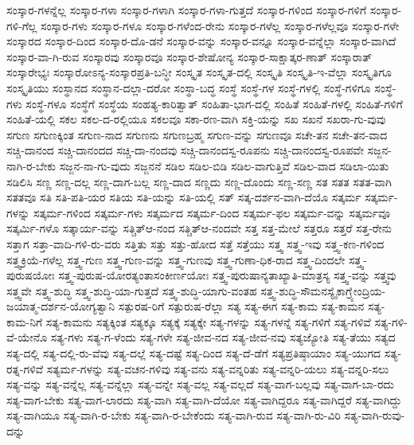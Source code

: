 {ಸಂಸ್ಕಾರ-ಗಳನ್ನೆಲ್ಲ
ಸಂಸ್ಕಾರ-ಗಳಾ
ಸಂಸ್ಕಾರ-ಗಳಾಗಿ
ಸಂಸ್ಕಾರ-ಗಳಾ-ಗುತ್ತದೆ
ಸಂಸ್ಕಾರ-ಗಳಿಂದ
ಸಂಸ್ಕಾರ-ಗಳಿಗೆ
ಸಂಸ್ಕಾರ-ಗಳಿ-ಗೆಲ್ಲ
ಸಂಸ್ಕಾರ-ಗಳು
ಸಂಸ್ಕಾರ-ಗಳೂ
ಸಂಸ್ಕಾರ-ಗಳೆಂದ-ರೇನು
ಸಂಸ್ಕಾರ-ಗಳೆಲ್ಲ
ಸಂಸ್ಕಾರ-ಗಳೆಲ್ಲವೂ
ಸಂಸ್ಕಾರ-ಗಳೇ
ಸಂಸ್ಕಾರದ
ಸಂಸ್ಕಾರ-ದಿಂದ
ಸಂಸ್ಕಾರ-ದೊ-ಡನೆ
ಸಂಸ್ಕಾರ-ವನ್ನು
ಸಂಸ್ಕಾರ-ವನ್ನೂ
ಸಂಸ್ಕಾರ-ವನ್ನೆಲ್ಲಾ
ಸಂಸ್ಕಾರ-ವಾಗಿದೆ
ಸಂಸ್ಕಾರ-ವಾ-ಗಿ-ರುವ
ಸಂಸ್ಕಾರವು
ಸಂಸ್ಕಾರವೂ
ಸಂಸ್ಕಾರ-ಶೇಷೋನ್ಯ
ಸಂಸ್ಕಾರ-ಸಾಕ್ಷಾತ್ಕರ-ಣಾತ್
ಸಂಸ್ಕಾರಾತ್
ಸಂಸ್ಕಾರೇಭ್ಯಃ
ಸಂಸ್ಕಾರೋಽನ್ಯ-ಸಂಸ್ಕಾರಪ್ರತಿ-ಬನ್ಧೀ
ಸಂಸ್ಕೃತ
ಸಂಸ್ಕೃತ-ದಲ್ಲಿ
ಸಂಸ್ಕೃತಿ
ಸಂಸ್ಕೃತಿ-ಇ-ವೆಲ್ಲಾ
ಸಂಸ್ಕೃತಿಗೂ
ಸಂಸ್ಕೃತಿಯು
ಸಂಸ್ಥಾನದ
ಸಂಸ್ಥಾನ-ದಲ್ಲಾ-ದರೋ
ಸಂಸ್ಥಾ-ಬದ್ಧ
ಸಂಸ್ಥೆ
ಸಂಸ್ಥೆ-ಗಳ
ಸಂಸ್ಥೆ-ಗಳಲ್ಲಿ
ಸಂಸ್ಥೆ-ಗಳಿಗೂ
ಸಂಸ್ಥೆ-ಗಳು
ಸಂಸ್ಥೆ-ಗಳೂ
ಸಂಸ್ಥೆಗೆ
ಸಂಸ್ಥೆಯ
ಸಂಹತ್ಯ-ಕಾರಿತ್ವಾತ್
ಸಂಹಿತಾ-ಭಾಗ-ದಲ್ಲಿ
ಸಂಹಿತೆ
ಸಂಹಿತೆ-ಗಳಲ್ಲಿ
ಸಂಹಿತೆ-ಗಳಿಗೆ
ಸಂಹಿತೆ-ಯಲ್ಲಿ
ಸಕಲ
ಸಕಲ-ದ-ರಲ್ಲಿಯೂ
ಸಕಲವೂ
ಸಕಾ-ರಣ-ವಾಗಿ
ಸಕ್ತಿ-ಯನ್ನು
ಸಖ
ಸಖನೆ
ಸಖರಾ-ಗು-ವುವು
ಸಗುಣ
ಸಗುಣಕ್ಕಿಂತ
ಸಗುಣ-ನಾದ
ಸಗುಣನು
ಸಗುಣಬ್ರಹ್ಮ
ಸಗುಣ-ವನ್ನು
ಸಗುಣವೂ
ಸಚೇ-ತನ
ಸಚೇ-ತನ-ವಾದ
ಸಚ್ಚಿ-ದಾನಂದ
ಸಚ್ಚಿ-ದಾನಂದದ
ಸಚ್ಚಿ-ದಾ-ನಂದವು
ಸಚ್ಚಿ-ದಾನಂದಸ್ವ-ರೂಪನು
ಸಚ್ಚಿ-ದಾನಂದಸ್ವ-ರೂಪವೇ
ಸಜ್ಜನ-ನಾಗಿ-ರ-ಬೇಕು
ಸಜ್ಜನ-ನಾ-ಗು-ವುದು
ಸಜ್ಜನನೆ
ಸಡಿಲ
ಸಡಿಲ-ಬಿಡಿ
ಸಡಿಲ-ವಾಗುತ್ತಿವೆ
ಸಡಿಲ-ವಾದ
ಸಡಿಲಾ-ಯಿತು
ಸಡಿಲಿಸಿ
ಸಣ್ಣ
ಸಣ್ಣ-ದಲ್ಲ
ಸಣ್ಣ-ದಾಗ-ಬಲ್ಲ
ಸಣ್ಣ-ದಾದ
ಸಣ್ಣದು
ಸಣ್ಣ-ದೊಂದು
ಸಣ್ಣ-ಸಣ್ಣ
ಸತ
ಸತತ
ಸತತ-ವಾಗಿ
ಸತತವೂ
ಸತಿ
ಸತಿ-ಪತಿ-ಯರ
ಸತಿಯ
ಸತಿ-ಯನ್ನು
ಸತಿ-ಯಲ್ಲಿ
ಸತ್
ಸತ್ಕ-ದರ್ಶನ-ವಾಗಿ-ದೆಯೊ
ಸತ್ಕರ್ಮ
ಸತ್ಕರ್ಮ-ಗಳನ್ನು
ಸತ್ಕರ್ಮ-ಗಳಿಂದ
ಸತ್ಕರ್ಮ-ಗಳು
ಸತ್ಕರ್ಮದ
ಸತ್ಕರ್ಮ-ದಿಂದ
ಸತ್ಕರ್ಮ-ಫಲ
ಸತ್ಕರ್ಮ-ವನ್ನು
ಸತ್ಕರ್ಮವೂ
ಸತ್ಕರ್ಮಿ-ಗಳೊ
ಸತ್ಕಾರ್ಯ-ವನ್ನು
ಸತ್ಚಿತ್ಆ-ನಂದ
ಸತ್ಚಿತ್ಆ-ನಂದವೇ
ಸತ್ತ
ಸತ್ತ-ಮೇಲೆ
ಸತ್ತರೂ
ಸತ್ತರೆ
ಸತ್ತ-ರೇನು
ಸತ್ತಾಗ
ಸತ್ತಾ-ವಾದಿ-ಗಳಿ-ರು-ವರು
ಸತ್ತಿತು
ಸತ್ತು
ಸತ್ತು-ಹೋದ
ಸತ್ತೆ
ಸತ್ತೆಯು
ಸತ್ತ್ವ
ಸತ್ತ್ವ-ಇವು
ಸತ್ತ್ವ-ಕಣ-ಗಳಿಂದ
ಸತ್ತ್ವಕ್ರಿಯೆ-ಗಳೆಲ್ಲ
ಸತ್ತ್ವ-ಗುಣ
ಸತ್ತ್ವ-ಗುಣ-ವನ್ನು
ಸತ್ತ್ವ-ಗುಣವು
ಸತ್ತ್ವ-ಗುಣಾ-ಧಿಕ-ರಾದ
ಸತ್ತ್ವ-ದಿಂದಲೇ
ಸತ್ತ್ವ-ಪುರುಷಯೋಃ
ಸತ್ತ್ವ-ಪುರುಷ-ಯೋರತ್ಯಂತಾಸಂಕೀರ್ಣಯೋಃ
ಸತ್ತ್ವ-ಪುರುಷಾನ್ಯತಾಖ್ಯಾತಿ-ಮಾತ್ರಸ್ಯ
ಸತ್ತ್ವ-ವನ್ನು
ಸತ್ತ್ವವು
ಸತ್ತ್ವವೇ
ಸತ್ತ್ವ-ಶುದ್ಧಿ
ಸತ್ತ್ವ-ಶುದ್ಧಿ-ಯಾ-ಗುತ್ತದೆ
ಸತ್ತ್ವ-ಶುದ್ಧಿ-ಯಾಗು-ವಂತಹ
ಸತ್ತ್ವ-ಶುದ್ಧಿ-ಸೌಮನಸ್ಯೈಕಾಗ್ರ್ಯೇಂದ್ರಿಯ-ಜಯಾತ್ಮ-ದರ್ಶನ-ಯೋಗ್ಯತ್ವಾನಿ
ಸತ್ಪುರಷ-ರಿಗೆ
ಸತ್ಪುರುಷ-ರೆಲ್ಲಾ
ಸತ್ಯ
ಸತ್ಯ-ಈಗ
ಸತ್ಯ-ಕಾಮ
ಸತ್ಯ-ಕಾಮನ
ಸತ್ಯ-ಕಾಮ-ನಿಗೆ
ಸತ್ಯ-ಕಾಮನು
ಸತ್ಯಕ್ಕಿಂತ
ಸತ್ಯಕ್ಕೂ
ಸತ್ಯಕ್ಕೆ
ಸತ್ಯಕ್ಕೇ
ಸತ್ಯ-ಗಳನ್ನು
ಸತ್ಯ-ಗಳನ್ನೆ
ಸತ್ಯ-ಗಳಿಗೆ
ಸತ್ಯ-ಗಳಿವೆ
ಸತ್ಯ-ಗಳಿ-ವೆ-ಯೇನೊ
ಸತ್ಯ-ಗಳು
ಸತ್ಯ-ಗ-ಳೆಂದು
ಸತ್ಯ-ಗಳೇ
ಸತ್ಯ-ಜೀವ-ನದ
ಸತ್ಯ-ಜೀವ-ನವು
ಸತ್ಯಜ್ಯೋತಿ
ಸತ್ಯ-ತೆಯು
ಸತ್ಯದ
ಸತ್ಯ-ದಲ್ಲಿ
ಸತ್ಯ-ದಲ್ಲಿ-ರು-ವೆವು
ಸತ್ಯ-ದಲ್ಲೆ
ಸತ್ಯ-ದಷ್ಟೆ
ಸತ್ಯ-ದಿಂದ
ಸತ್ಯ-ದೆ-ಡೆಗೆ
ಸತ್ಯಪ್ರತಿಷ್ಠಾಯಾಂ
ಸತ್ಯ-ಯುಗದ
ಸತ್ಯ-ರತ್ನ-ಗಳಿವೆ
ಸತ್ಯರ್ಮ-ಗಳನ್ನು
ಸತ್ಯ-ವಚನ-ಗಳಿವು
ಸತ್ಯ-ವನು
ಸತ್ಯ-ವನ್ನರಿತು
ಸತ್ಯ-ವನ್ನರಿ-ಯಲು
ಸತ್ಯ-ವನ್ನರಿ-ಸಲು
ಸತ್ಯ-ವನ್ನು
ಸತ್ಯ-ವನ್ನೆಲ್ಲ
ಸತ್ಯ-ವನ್ನೆಲ್ಲಾ
ಸತ್ಯ-ವನ್ನೇ
ಸತ್ಯ-ವಲ್ಲ
ಸತ್ಯ-ವಲ್ಲದೆ
ಸತ್ಯ-ವಾಗ-ಬಲ್ಲವು
ಸತ್ಯ-ವಾಗ-ಬಾ-ರದು
ಸತ್ಯ-ವಾಗ-ಬೇಕು
ಸತ್ಯ-ವಾಗ-ಲಾರದು
ಸತ್ಯ-ವಾಗಿ
ಸತ್ಯ-ವಾಗಿ-ದೆಯೋ
ಸತ್ಯ-ವಾಗಿದ್ದರೂ
ಸತ್ಯ-ವಾಗಿದ್ದರೆ
ಸತ್ಯ-ವಾಗಿದ್ದು
ಸತ್ಯ-ವಾಗಿಯೂ
ಸತ್ಯ-ವಾಗಿ-ರ-ಬೇಕು
ಸತ್ಯ-ವಾಗಿ-ರ-ಬೇಕೆಂದು
ಸತ್ಯ-ವಾಗಿ-ರುವ
ಸತ್ಯ-ವಾಗಿ-ರು-ವಿರಿ
ಸತ್ಯ-ವಾಗಿ-ರುವು-ದನ್ನು
}
